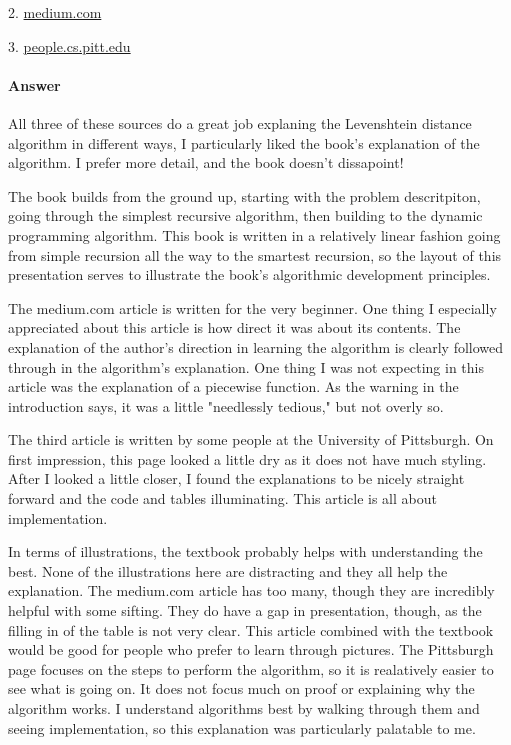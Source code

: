 \documentclass{article}
\begin{document}
2. \href{https://medium.com/@ethannam/understanding-the-levenshtein-distance-equation-for-beginners-c4285a5604f0}{medium.com}

3. \href{https://people.cs.pitt.edu/~kirk/cs1501/Pruhs/Spring2006/assignments/editdistance/Levenshtein%20Distance.htm}{people.cs.pitt.edu}

\paragraph{Answer}

All three of these sources do a great job explaning the Levenshtein distance algorithm
in different ways, I particularly liked the book's explanation of the algorithm.
I prefer more detail, and the book doesn't dissapoint!

The book builds from the ground up, starting with the problem descritpiton, going
through the simplest recursive algorithm, then building to the dynamic programming
algorithm. This book is written in a relatively linear fashion going from simple
recursion all the way to the smartest recursion, so the layout of this presentation
serves to illustrate the book's algorithmic development principles.

The medium.com article is written for the very beginner. One thing I especially
appreciated about this article is how direct it was about its contents. The
explanation of the author's direction in learning the algorithm is clearly followed
through in the algorithm's explanation. One thing I was not expecting in this article
was the explanation of a piecewise function. As the warning in the introduction says,
it was a little "needlessly tedious," but not overly so.

The third article is written by some people at the University of Pittsburgh.
On first impression, this page looked a little dry as it does not have much styling.
After I looked a little closer, I found the explanations to be nicely straight forward
and the code and tables illuminating. This article is all about implementation.

In terms of illustrations, the textbook probably helps with understanding the best.
None of the illustrations here are distracting and they all help the explanation.
The medium.com article has too many, though they are incredibly helpful with some
sifting. They do have a gap in presentation, though, as the filling in of the table
is not very clear. This article combined with the textbook would be good for people
who prefer to learn through pictures. The Pittsburgh page focuses on the steps
to perform the algorithm, so it is realatively easier to see what is going on.
It does not focus much on proof or explaining why the algorithm works. I understand
algorithms best by walking through them and seeing implementation, so this explanation
was particularly palatable to me.
\end{document}

